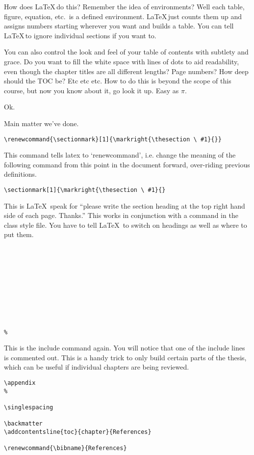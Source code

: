 How does \LaTeX\,do this? Remember the idea of environments?  Well each table, figure, equation, etc.~is a defined environment. \LaTeX\,just counts them up and assigns numbers starting wherever you want and builds a table.  You can tell \LaTeX\,to ignore individual sections if you want to.

You can also control the look and feel of your table of contents with subtlety and grace. Do you want to fill the white space with lines of dots to aid readability, even though the chapter titles are all different lengths? Page numbers? How deep should the TOC be? Etc etc etc. How to do this is beyond the scope of this course, but now you know about it, go look it up. Easy as $\pi$.

Ok.

Main matter we've done.

\begin{verbatim}
\renewcommand{\sectionmark}[1]{\markright{\thesection \ #1}{}}
\end{verbatim}

This command tells latex to `renewcommand', i.e. change the meaning of the following command from this point in the document forward, over-riding previous definitions.
\begin{verbatim}
\sectionmark[1]{\markright{\thesection \ #1}{}
\end{verbatim}

This is \LaTeX\ speak for ``please write the section heading at the top right hand side of each page. Thanks.'' This works in conjunction with a command in the class style file. You have to tell \LaTeX\ to switch on headings as well as where to put them.

\begin{verbatim}










%
\end{verbatim}

This is the include command again. You will notice that one of the include lines is commented out. This is a handy trick to only build certain parts of the thesis, which can be useful if individual chapters are being reviewed.

\pagebreak

\begin{verbatim}
\appendix
%

\singlespacing

\backmatter
\addcontentsline{toc}{chapter}{References}

\renewcommand{\bibname}{References}

\end{verbatim}

